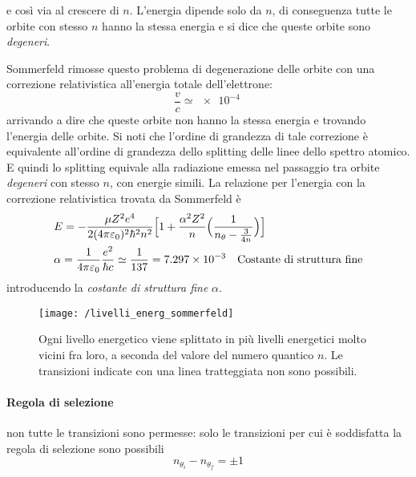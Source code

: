 e così via al crescere di $n$.
L'energia dipende solo da $n$, di conseguenza tutte le orbite con stesso $n$ hanno la stessa energia e si dice che queste orbite sono \textit{degeneri}.

Sommerfeld rimosse questo problema di degenerazione delle orbite con una correzione relativistica all'energia totale dell'elettrone:
\begin{equation}
\frac{ v}{ c} \simeq \SI{e-4}{}
\end{equation}
arrivando a dire che queste orbite non hanno la stessa energia e trovando l'energia delle orbite.
Si noti che l'ordine di grandezza di tale correzione è equivalente all'ordine di grandezza dello splitting delle linee dello spettro atomico.
E quindi lo splitting equivale alla radiazione emessa nel passaggio tra orbite \textit{degeneri} con stesso $n$, con energie simili.
La relazione per l'energia con la correzione relativistica trovata da Sommerfeld è
\begin{equation}
\begin{split}
& E = - \frac{ \mu Z^2 e^4}{2 (4\pi\varepsilon_0)^2 \hbar^2 n^2 } \Bigl[ 1 + \frac{ \alpha^2 Z^2}{n } \Bigl(  \frac{ 1}{n_{\theta} - \frac{ 3}{4 n } }  \Bigr) \Bigr] \\
& \alpha = \frac{ 1}{4\pi\varepsilon_0 } \frac{ e^2}{\hbar c } \simeq \frac{ 1}{137 } = \SI{7.297e-3}{} \quad \mbox{Costante di struttura fine}
\end{split}
\end{equation}
introducendo la \textit{costante di struttura fine} $\alpha$.
\begin{figure}[h]
\centering
\texttt{[image: /livelli\_energ\_sommerfeld]}
\caption{Ogni livello energetico viene splittato in più livelli energetici molto vicini fra loro, a seconda del valore del numero quantico $n$. Le transizioni indicate con una linea tratteggiata non sono possibili.}
\end{figure}

\paragraph{Regola di selezione} non tutte le transizioni sono permesse: solo le transizioni per cui è soddisfatta la regola di selezione sono possibili
\begin{equation}
n_{\theta_i} - n_{\theta_f} = \pm 1
\end{equation}

